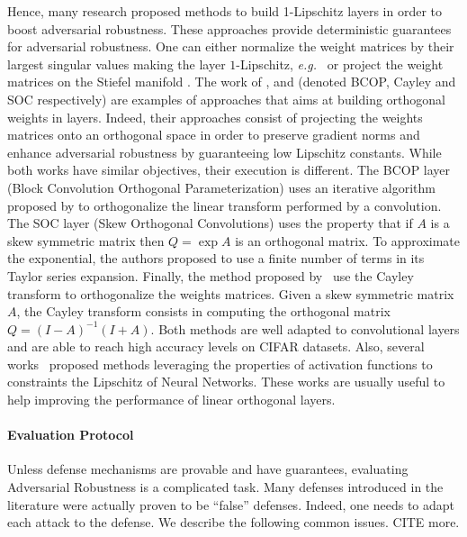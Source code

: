 Hence, many research proposed methods to build 1-Lipschitz layers in order to boost adversarial robustness. These approaches provide deterministic guarantees for adversarial robustness. One can either normalize the weight matrices by their largest singular values making the layer $1$-Lipschitz, \emph{e.g.}~\citep{yoshida2017spectral,miyato2018spectral,farnia2018generalizable,anil2019sorting} or project the weight matrices on the Stiefel manifold \citep{li2019preventing,trockman2021orthogonalizing,skew2021sahil}.
The work of \citet{li2019preventing}, \citet{trockman2021orthogonalizing} and \citet{skew2021sahil} (denoted BCOP, Cayley and SOC respectively) are examples of approaches that aims at building orthogonal weights in layers.
Indeed, their approaches consist of projecting the weights matrices onto an orthogonal space in order to preserve gradient norms and enhance adversarial robustness by guaranteeing low Lipschitz constants. 
While both works have similar objectives, their execution is different.
The BCOP layer (Block Convolution Orthogonal Parameterization) uses an iterative algorithm proposed by \citet{bjorck1971iterative} to orthogonalize the linear transform performed by a convolution.
The SOC layer (Skew Orthogonal Convolutions) uses the property that if $A$ is a skew symmetric matrix then $Q=\exp{A}$ is an orthogonal matrix. To approximate the exponential, the authors proposed to use a finite number of terms in its Taylor series expansion.
Finally, the method proposed by~\citet{trockman2021orthogonalizing} use the Cayley transform to orthogonalize the weights matrices.
Given a skew symmetric matrix $A$, the Cayley transform consists in computing the orthogonal matrix $Q = (I - A)^{-1} (I + A)$. Both methods are well adapted to convolutional layers and are able to reach high accuracy levels on CIFAR datasets. Also, several works~\cite{anil2019sorting,singla2021householder,huang2021local} proposed methods leveraging the properties of activation functions to constraints the Lipschitz of Neural Networks. These works are usually useful to help  improving the performance of linear orthogonal layers.





\paragraph{Evaluation Protocol}

Unless defense mechanisms are provable and have guarantees, evaluating Adversarial Robustness is a complicated task. Many  defenses introduced in the literature were actually proven to be ``false'' defenses. Indeed, one needs to adapt each attack to the defense. We describe the following common issues. CITE more. 

